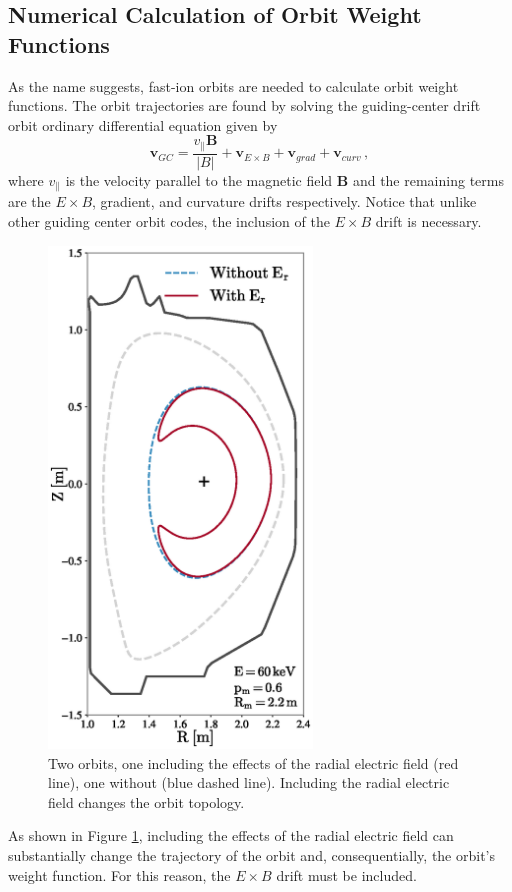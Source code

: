 \subsection{Numerical Calculation of Orbit Weight Functions}
As the name suggests, fast-ion orbits are needed to calculate orbit weight functions. The orbit trajectories are found by solving the guiding-center drift orbit ordinary differential equation given by
\begin{equation}\label{eq:gc_ode}
    \mathbf{v}_{GC} = \frac{v_{\parallel}\mathbf{B}}{|B|} + \mathbf{v}_{E \times B} + \mathbf{v}_{grad} + \mathbf{v}_{curv}\,,
\end{equation}
where $v_{\parallel}$ is the velocity parallel to the magnetic field $\mathbf{B}$ and the remaining terms are the $E\times B$, gradient, and curvature drifts respectively. Notice that unlike other guiding center orbit codes, the inclusion of the $E \times B$ drift is necessary.
\begin{figure}[h!]
    \centering
    \includegraphics[width=7cm]{figures/orbit_er.eps}
    \caption{Two orbits, one including the effects of the radial electric field (red line), one without (blue dashed line). Including the radial electric field changes the orbit topology.}
    \label{fig:orbit_er}
\end{figure}
As shown in Figure \ref{fig:orbit_er}, including the effects of the radial electric field can substantially change the trajectory of the orbit and, consequentially, the orbit's weight function. For this reason, the $E \times B$ drift must be included.

